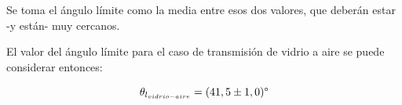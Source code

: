 \documentclass[a4paper,twocolumn]{article}
\begin{document}
                \begin{table}[!ht]
                	\centering
            		\caption{Ángulos de incidencia $\theta_i$ desde el agua al aire en torno al ángulo límite.}
                		
                		
            		\label{tab:AngLimAguAir}
            	\end{table}  


     
	    Se toma el ángulo límite como la media entre esos dos valores, que deberán estar -y están- muy cercanos.
	    
	 El valor del ángulo límite para el caso de transmisión de vidrio a aire se puede considerar entonces:
        
        $$ \theta_{l_{vidrio-aire}} = (41,5 \pm 1,0)\text{\textdegree}$$
        
\end{document}
